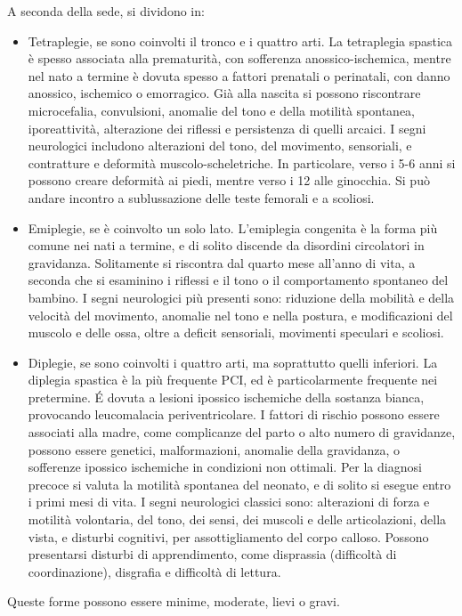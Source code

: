 A seconda della sede, si dividono in:
\begin{itemize}
\item Tetraplegie, se sono coinvolti il tronco e i quattro arti. La tetraplegia spastica è spesso associata alla prematurità, con
sofferenza anossico-ischemica, mentre nel nato a termine è dovuta spesso a fattori prenatali o perinatali, con danno anossico, ischemico
o emorragico. Già alla nascita si possono riscontrare microcefalia, convulsioni, anomalie del tono e della motilità spontanea,
iporeattività, alterazione dei riflessi e persistenza di quelli arcaici. I segni neurologici includono alterazioni del tono, del
movimento, sensoriali, e contratture e deformità muscolo-scheletriche. In particolare, verso i 5-6 anni si possono creare deformità ai
piedi, mentre verso i 12 alle ginocchia. Si può andare incontro a sublussazione delle teste femorali e a scoliosi.
\item Emiplegie, se è coinvolto un solo lato. L'emiplegia congenita è la forma più comune nei nati a termine, e di solito discende da
disordini circolatori in gravidanza. Solitamente si riscontra dal quarto mese all'anno di vita, a seconda che si esaminino i riflessi e
il tono o il comportamento spontaneo del bambino. I segni neurologici più presenti sono: riduzione della mobilità e della velocità del
movimento, anomalie nel tono e nella postura, e modificazioni del muscolo e delle ossa, oltre a deficit sensoriali, movimenti speculari
e scoliosi. 	
\item Diplegie, se sono coinvolti i quattro arti, ma soprattutto quelli inferiori. La diplegia spastica è la più frequente PCI, ed è
particolarmente frequente nei pretermine. \'E dovuta a lesioni ipossico ischemiche della sostanza bianca, provocando leucomalacia
periventricolare. I fattori di rischio possono essere associati alla madre, come complicanze del parto o alto numero di gravidanze,
possono essere genetici, malformazioni, anomalie della gravidanza, o sofferenze ipossico ischemiche in condizioni non ottimali. Per la
diagnosi precoce si valuta la motilità spontanea del neonato, e di solito si esegue entro i primi mesi di vita. I segni neurologici
classici sono: alterazioni di forza e motilità volontaria, del tono, dei sensi, dei muscoli e delle articolazioni, della vista, e
disturbi cognitivi, per assottigliamento del corpo calloso. Possono presentarsi disturbi di apprendimento, come disprassia (difficoltà
di coordinazione), disgrafia e difficoltà di lettura.
\end{itemize}
Queste forme possono essere minime, moderate, lievi o gravi.

